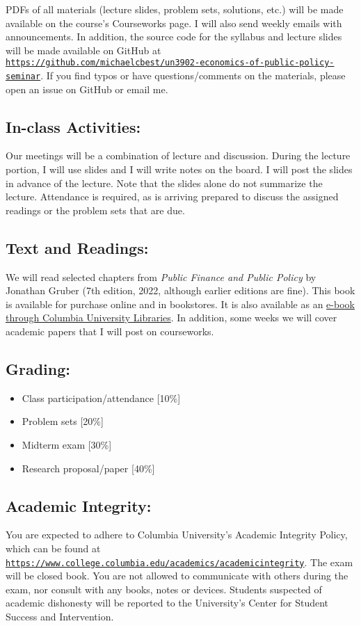 \documentclass[11pt]{article}
\begin{document}
PDFs of all materials (lecture slides, problem sets, solutions, etc.) will be made available on the course's Courseworks page. I will also send weekly emails with announcements. In addition, the source code for the syllabus and lecture slides will be made available on GitHub at \href{https://github.com/michaelcbest/un3902-economics-of-public-policy-seminar}{\nolinkurl{https://github.com/michaelcbest/un3902-economics-of-public-policy-seminar}}. If you find typos or have questions/comments on the materials, please open an issue on GitHub or email me.

\subsection*{In-class Activities:}
Our meetings will be a combination of lecture and discussion. During the lecture portion, I will use slides and I will write notes on the board. I will post the slides in advance of the lecture. Note that the slides alone do not summarize the lecture. Attendance is required, as is arriving prepared to discuss the assigned readings or the problem sets that are due.

\subsection*{Text and Readings:}
We will read selected chapters from \textit{Public Finance and Public Policy
} by Jonathan Gruber (7th edition, 2022, although earlier editions are fine). This book is available for purchase online and in bookstores. It is also available as an \href{https://ebookcentral.proquest.com/lib/columbia/detail.action?docID=6925765}{e-book through Columbia University Libraries}. In addition, some weeks we will cover academic papers that I will post on courseworks.

\subsection*{Grading:}
\begin{itemize}
    \setlength{\itemsep}{0em}
    \item Class participation/attendance [10\%]
    \item Problem sets [20\%]
    \item Midterm exam [30\%]
    \item Research proposal/paper [40\%]
\end{itemize}

\subsection*{Academic Integrity:}
You are expected to adhere to Columbia University's Academic Integrity Policy, which can be found at \href{https://www.college.columbia.edu/academics/academicintegrity}{\nolinkurl{https://www.college.columbia.edu/academics/academicintegrity}}. The exam will be closed book. You are not allowed to communicate with others during the exam, nor consult with any books, notes or devices. Students suspected of academic dishonesty will be reported to the University's Center for Student Success and Intervention.
\end{document}
